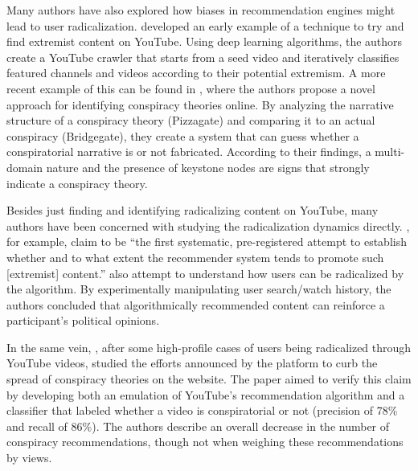 Many authors have also explored how biases in recommendation engines might lead
to user radicalization. \citet{agarwal_topic-specific_2015} developed an early
example of a technique to try and find extremist content on YouTube. Using deep
learning algorithms, the authors create a YouTube crawler that starts from a
seed video and iteratively classifies featured channels and videos according to
their potential extremism. A more recent example of this can be found in
\citet{tangherlini_automated_2020}, where the authors propose a novel approach
for identifying conspiracy theories online. By analyzing the narrative structure
of a conspiracy theory (Pizzagate) and comparing it to an actual conspiracy
(Bridgegate), they create a system that can guess whether a conspiratorial
narrative is or not fabricated. According to their findings, a multi-domain
nature and the presence of keystone nodes are signs that strongly indicate a
conspiracy theory.

Besides just finding and identifying radicalizing content on YouTube, many
authors have been concerned with studying the radicalization dynamics directly.
\citet{alfano_technologically_2020}, for example, claim to be ``the first
systematic, pre-registered attempt to establish whether and to what extent the
recommender system tends to promote such [extremist] content.''
\citet{cho_search_2020} also attempt to understand how users can be radicalized
by the algorithm. By experimentally manipulating user search/watch history, the
authors concluded that algorithmically recommended content can reinforce a
participant's political opinions.

In the same vein, \citet{faddoul_longitudinal_2020}, after some high-profile
cases of users being radicalized through YouTube videos, studied the efforts
announced by the platform to curb the spread of conspiracy theories on the
website. The paper aimed to verify this claim by developing both an emulation of
YouTube's recommendation algorithm and a classifier that labeled whether a video
is conspiratorial or not (precision of 78\% and recall of 86\%). The authors
describe an overall decrease in the number of conspiracy recommendations, though
not when weighing these recommendations by views.

